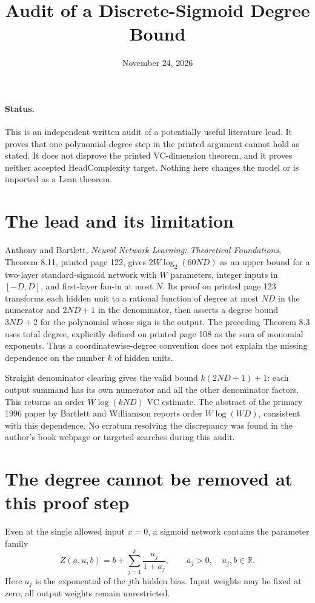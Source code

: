 \documentclass[11pt]{article}
\title{Audit of a Discrete-Sigmoid Degree Bound}
\author{}
\date{November 24, 2026}
\begin{document}
\maketitle

\paragraph{Status.}
This is an independent written audit of a potentially useful literature
lead. It proves that one polynomial-degree step in the printed argument
cannot hold as stated. It does not disprove the printed VC-dimension
theorem, and it proves neither accepted HeadComplexity target. Nothing
here changes the model or is imported as a Lean theorem.

\section{The lead and its limitation}
Anthony and Bartlett, \emph{Neural Network Learning: Theoretical
Foundations}, Theorem 8.11, printed page 122, gives
$2W\log_2(60ND)$ as an upper bound for a two-layer standard-sigmoid
network with $W$ parameters, integer inputs in $[-D,D]$, and first-layer
fan-in at most $N$. Its proof on printed page 123 transforms each hidden
unit to a rational function of degree at most $ND$ in the numerator and
$2ND+1$ in the denominator, then asserts a degree bound $3ND+2$ for
the polynomial whose sign is the output. The preceding Theorem 8.3
uses total degree, explicitly defined on printed page 108 as the sum
of monomial exponents. Thus a coordinatewise-degree convention does
not explain the missing dependence on the number $k$ of hidden units.

Straight denominator clearing gives the valid bound
$k(2ND+1)+1$: each output summand has its own numerator and all the
other denominator factors. This returns an order
$W\log(kND)$ VC estimate. The abstract of the primary 1996 paper by
Bartlett and Williamson reports order $W\log(WD)$, consistent with
this dependence. No erratum resolving the discrepancy was found in
the author's book webpage or targeted searches during this audit.

\section{The degree cannot be removed at this proof step}
Even at the single allowed input $x=0$, a sigmoid network contains
the parameter family
\[
 Z(a,u,b)=b+\sum_{j=1}^k\frac{u_j}{1+a_j},
 \qquad a_j>0,\quad u_j,b\in\mathbb R.
\]
Here $a_j$ is the exponential of the $j$th hidden bias. Input weights
may be fixed at zero; all output weights remain unrestricted.
\end{document}
